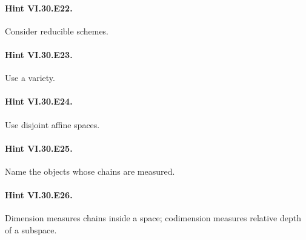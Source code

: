 \paragraph{Hint VI.30.E22.} Consider reducible schemes.

\paragraph{Hint VI.30.E23.} Use a variety.

\paragraph{Hint VI.30.E24.} Use disjoint affine spaces.

\paragraph{Hint VI.30.E25.} Name the objects whose chains are measured.

\paragraph{Hint VI.30.E26.} Dimension measures chains inside a space; codimension measures relative depth of a subspace.